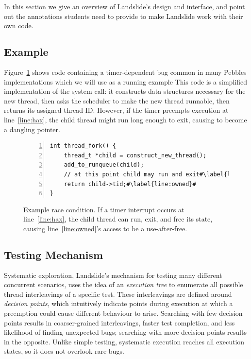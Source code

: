 In this section we give an overview of Landslide's design and interface, and point out the annotations students need to provide to make Landslide work with their own code.

\subsection{Example}

Figure~\ref{fig:threadfork} shows code containing a timer-dependent bug common in many Pebbles implementations which we will use as a running example
This code is a simplified implementation of the  system call: it constructs data structures necessary for the new thread, then asks the scheduler to make the new thread runnable, then returns its assigned thread ID.
However, if the timer preempts execution at line~\ref{line:hax}, the child thread might run long enough to exit, causing  to become a dangling pointer.

\begin{figure}[t]
\small
\begin{lstlisting}[numbers=left]
int thread_fork() {
	thread_t *child = construct_new_thread();
	add_to_runqueue(child);
	// at this point child may run and exit#\label{line:hax}#
	return child->tid;#\label{line:owned}#
}
\end{lstlisting}
\caption{Example race condition. If a timer interrupt occurs at line~\ref{line:hax}, the child thread can run, exit, and free its state, causing line~\ref{line:owned}'s access to be a use-after-free.}
\label{fig:threadfork}
\end{figure}

\subsection{Testing Mechanism}

Systematic exploration, Landslide's mechanism for testing many different concurrent scenarios, uses the idea of an {\em execution tree} to enumerate all possible thread interleavings of a specific test. These interleavings are defined around {\em decision points}, which intuitively indicate points during execution at which a preemption could cause different behaviour to arise.
Searching with few decision points results in coarser-grained interleavings, faster test completion, and less likelihood of finding unexpected bugs; searching with more decision points results in the opposite.
Unlike simple testing, systematic execution reaches all execution states, so it does not overlook rare bugs.


